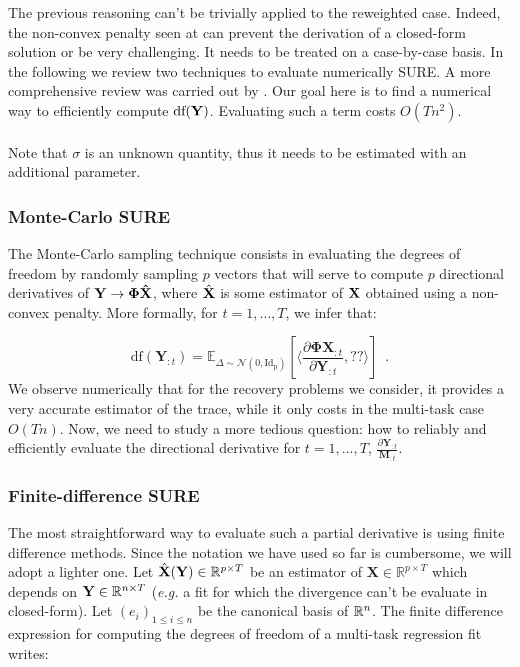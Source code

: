 \documentclass[a4paper,10pt]{article}
\theoremstyle{definition}
\begin{document}
The previous reasoning can't be trivially applied to the reweighted case. Indeed, the non-convex penalty seen at  can prevent
the derivation of a closed-form solution or be very challenging. It needs to be treated on a case-by-case basis. In the following we review two
techniques to evaluate numerically SURE. A more comprehensive review was carried out by \cite{Deledalle_Vaiter_Fadili_Peyre14}. Our goal here is
to find a numerical way to efficiently compute $\text{df}(\mathbf{Y})$. Evaluating such a term costs $O(Tn^2)$.
\\
\\
Note that $\sigma$ is an unknown quantity, thus it needs to be estimated with an additional parameter.
%
\subsubsection*{Monte-Carlo SURE}

The Monte-Carlo sampling technique consists in evaluating the degrees of freedom by randomly sampling $p$ vectors that will serve to compute $p$ directional derivatives
of $\bf{Y} \rightarrow \Phi \hat{X}$, where $\hat{\bf X}$ is some estimator of $\bf X$ obtained using a non-convex penalty.
%
More formally, for $t = 1, \dots, T$, we infer that:

\begin{equation*}
    \text{df}(\mathbf{Y}_{:t}) = \mathbb{E}_{\Delta \sim \mathcal{N}(0, \text{Id}_\text{p})}\left[ \langle \frac{\partial \mathbf{\Phi X}_{:t} }{\partial \mathbf{Y}_{:t}}, ?? \rangle \right]
    \enspace .
\end{equation*}
%
We observe numerically that for the recovery problems we consider, it provides a very accurate estimator of the trace, while
it only costs in the multi-task case $O(Tn)$. Now, we need to study a more tedious question: how to reliably and efficiently
evaluate the directional derivative for $t=1, \dots, T$, $\frac{\partial \mathbf{Y}_{:t} }{\mathbf{M}_{:t}}$.

\subsubsection*{Finite-difference SURE}

The most straightforward way to evaluate such a partial derivative is using finite difference methods.
Since the notation we have used so far is cumbersome, we will adopt a lighter one. Let $\hat{\mathbf{X}}(\mathbf{Y}) \in \mathbb{R}^{p\times T}$ be an estimator
of $\mathbf{X} \in \mathbb{R}^{p\times T}$ which depends on $\mathbf{Y} \in \mathbb{R}^{n \times T}$ (\textit{e.g.} a  fit for which the divergence
can't be evaluate in closed-form). Let $(e_i)_{1 \leq i \leq n}$ be the canonical basis of $\mathbb{R}^n$. The finite difference expression for computing
the degrees of freedom of a multi-task regression fit writes:
\end{document}
